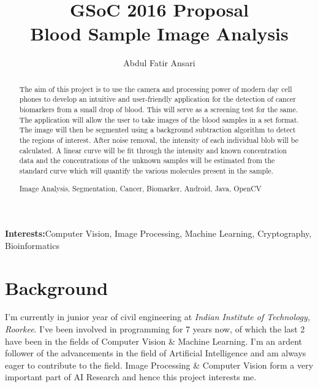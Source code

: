 \documentclass[runningheads,a4paper]{llncs}
\newcommand{\keywords}[1]{\par\addvspace\baselineskip
\noindent\keywordname\enspace\ignorespaces#1}
\newcommand{\interests}[1]{\par\addvspace\baselineskip
\noindent \textbf{Interests:}\enspace\ignorespaces#1}
\begin{document}
\mainmatter  %

\title{GSoC 2016 Proposal \\ Blood Sample Image Analysis}


\author{Abdul Fatir Ansari}
%


\maketitle

\interests{Computer Vision, Image Processing, Machine Learning, Cryptography, Bioinformatics}

\begin{abstract}
The aim of this project is to use the camera and processing power of modern day cell phones to develop an intuitive and user-friendly application for the detection of cancer biomarkers from a small drop of blood. This will serve as a screening test for the same. The application will allow the user to take images of the blood samples in a set format. The image will then be segmented using a background subtraction algorithm to detect the regions of interest. After noise removal, the intensity of each individual blob will be calculated. A linear curve will be fit through the intensity and known concentration data and the concentrations of the unknown samples will be estimated from the standard curve which will quantify the various molecules present in the sample.
\keywords{Image Analysis, Segmentation, Cancer, Biomarker, Android, Java, OpenCV}
\end{abstract}

\section{Background}

I'm currently in junior year of civil engineering at \emph{Indian Institute of Technology, Roorkee}. I've been involved in programming for 7 years now, of which the last 2 have been in the fields of Computer Vision \& Machine Learning. I'm an ardent follower of the advancements in the field of Artificial Intelligence and am always eager to contribute to the field. Image Processing \& Computer Vision form a very important part of AI Research and hence this project interests me.
\end{document}
